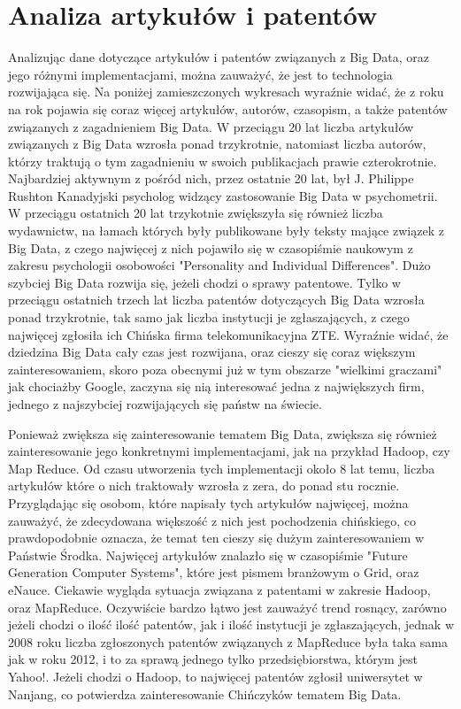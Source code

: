 \documentclass[10pt,twocolumn]{llncs}          %
\begin{document}
\section{Analiza artykułów i patentów}
\label{sub:analiza_artykulow}
Analizując dane dotyczące artykułów i patentów związanych z Big Data, oraz jego różnymi implementacjami, można zauważyć, że jest to technologia rozwijająca się. Na poniżej zamieszczonych wykresach wyraźnie widać, że z roku na rok pojawia się coraz więcej artykułów, autorów, czasopism, a także patentów związanych z zagadnieniem Big Data. W przeciągu 20 lat liczba artykułów związanych z Big Data wzrosła ponad trzykrotnie, natomiast liczba autorów, którzy traktują o tym zagadnieniu w swoich publikacjach prawie czterokrotnie. Najbardziej aktywnym z pośród nich, przez ostatnie 20 lat, był J. Philippe Rushton Kanadyjski psycholog widzący zastosowanie Big Data w psychometrii. W przeciągu ostatnich 20 lat trzykotnie zwiększyła się również liczba wydawnictw, na łamach których były publikowane były teksty mające związek z Big Data, z czego najwięcej z nich pojawiło się w czasopiśmie naukowym z zakresu psychologii osobowości "Personality and Individual Differences". Dużo szybciej Big Data rozwija się, jeżeli chodzi o sprawy patentowe. Tylko w przeciągu ostatnich trzech lat liczba patentów dotyczących Big Data wzrosła ponad trzykrotnie, tak samo jak liczba instytucji je zgłaszających, z czego najwięcej zgłosiła ich Chińska firma telekomunikacyjna ZTE. Wyraźnie widać, że dziedzina Big Data cały czas jest rozwijana, oraz cieszy się coraz większym zainteresowaniem, skoro poza obecnymi już w tym obszarze "wielkimi graczami" jak chociażby Google, zaczyna się nią interesować jedna z największych firm, jednego z najszybciej rozwijających się państw na świecie.

Ponieważ zwiększa się zainteresowanie tematem Big Data, zwiększa się również zainteresowanie jego konkretnymi implementacjami, jak na przykład Hadoop, czy Map Reduce. Od czasu utworzenia tych implementacji około 8 lat temu, liczba artykułów które o nich traktowały wzrosła z zera, do ponad stu rocznie. Przyglądając się osobom, które napisały tych artykułów najwięcej, można zauważyć, że zdecydowana większość z nich jest pochodzenia chińskiego, co prawdopodobnie oznacza, że temat ten cieszy się dużym zainteresowaniem w Państwie Środka. Najwięcej artykułów znalazło się w czasopiśmie "Future Generation Computer Systems", które jest pismem branżowym o Grid, oraz eNauce. Ciekawie wygląda sytuacja związana z patentami w zakresie Hadoop, oraz MapReduce. Oczywiście bardzo łątwo jest zauważyć trend rosnący, zarówno jeżeli chodzi o ilość ilość patentów, jak i ilość instytucji je zgłaszających, jednak w 2008 roku liczba zgłoszonych patentów związanych z MapReduce była taka sama jak w roku 2012, i to za sprawą jednego tylko przedsiębiorstwa, którym jest Yahoo!. Jeżeli chodzi o Hadoop, to najwięcej patentów zgłosił uniwersytet w Nanjang, co potwierdza zainteresowanie Chińczyków tematem Big Data.
\end{document}
